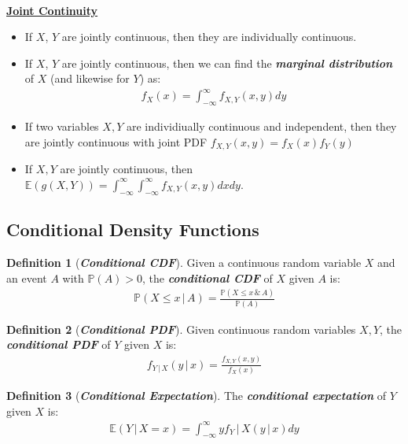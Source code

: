 \documentclass[12pt]{extarticle}
\newcommand{\pstart}[0]{\noindent}
\newcommand{\newp}[0]{~\\\pstart}
\newcommand{\term}[1]{\textbf{\textit{#1}}}
\newcommand{\titleul}[1]{\pstart\textbf{\ul{#1}}}
\theoremstyle{definition}
\newtheorem*{definition}{Definition}
\theoremstyle{remark}
\newcommand{\prob}[1]{\mathbb{P}\left(#1\right)}
\newcommand{\cond}[2]{#1\,\vert\,#2}
\newcommand{\expected}[1]{\mathbb{E}\left(#1\right)}
\begin{document}
\newp
\titleul{Joint Continuity}
\begin{itemize}
    \item If $X$, $Y$ are jointly continuous, then they are individually 
continuous.
    \item If $X$, $Y$ are jointly continuous, then we can find the 
\term{marginal distribution} of $X$ (and likewise for $Y$) as: 
\begin{align*}
        f_X(x)=\int_{-\infty}^\infty f_{X,Y}(x,y)dy
    \end{align*}
    \item If two variables $X,Y$ are individiually continuous and 
independent, then they are jointly continuous with joint PDF 
$f_{X,Y}(x,y)=f_X(x)f_Y(y)$
    \item If $X,Y$ are jointly continuous, then 
$\expected{g(X,Y)}=\int_{-\infty}^\infty\int_{-\infty}^\infty 
f_{X,Y}(x,y)dxdy$.
\end{itemize}

\subsection{Conditional Density Functions}
\begin{tcolorbox}[colback=blue!60!green!15!white]
\begin{definition}[\term{Conditional CDF}]
    Given a continuous random variable $X$ and an event $A$ with 
$\prob{A}>0$, the \term{conditional CDF} of $X$ given $A$ is: 
\begin{align*}
        \prob{\cond{X\leq x}{A}}=\frac{\prob{X\leq x\,\&\,A}}{\prob{A}}
    \end{align*}
\end{definition}

\begin{definition}[\term{Conditional PDF}]
    Given continuous random variables $X,Y$, the \term{conditional PDF} of 
$Y$ given $X$ is: \begin{align*}
        f_{\cond{Y}{X}}(\cond{y}{x})=\frac{f_{X,Y}(x,y)}{f_X(x)}
    \end{align*}
\end{definition}
\end{tcolorbox}

\begin{tcolorbox}[colback=blue!8!white]
    \begin{definition}[\term{Conditional Expectation}]
        The \term{conditional expectation} of $Y$ given $X$ is: 
\begin{align*}
            \expected{\cond{Y}{X=x}}=\int_{-\infty}^\infty 
yf_\cond{Y}{X}(\cond{y}{x})dy
        \end{align*}
    \end{definition}
\end{tcolorbox}
\end{document}
